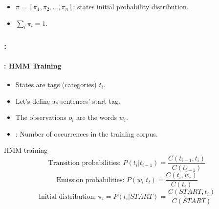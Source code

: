 \documentclass[xcolor=table]{beamer}
\begin{document}
\begin{frame}
\begin{minipage}{.45\textwidth}
	\end{minipage}
	
	\begin{itemize}
		\item $\pi = [\pi_1, \pi_2, \ldots, \pi_n ]$: states initial probability distribution.
		\item $\sum_i \pi_i = 1$.
	\end{itemize}
	
\end{frame}

\begin{frame}
	\frametitle{\insertshortsubtitle: \insertsection}
	\framesubtitle{\insertsubsection: HMM Training}
	
	\begin{itemize}
		\item States are tags (categories) $t_i$.
		\item Let's define  as sentences' start tag.
		\item The observations $o_i$ are the words $w_i$.
		\item {}: Number of occurrences in the training corpus.
	\end{itemize}
	
	\begin{block}{HMM training}
		\[
		\text{Transition probabilities: } P(t_i | t_{i-1}) = \frac{C(t_{i-1}, t_i)}{C(t_{i-1})} 
		\]\[
		\text{Emission probabilities: } P(w_i | t_i) = \frac{C(t_i, w_i)}{C(t_i)}
		\]\[
		\text{Initial distribution: } \pi_i = P(t_i | START) = \frac{C(START, t_i)}{C(START)}
		\]
	\end{block}
\end{frame}
\end{document}
